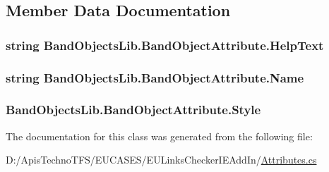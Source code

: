 \subsection{Member Data Documentation}
\hypertarget{class_band_objects_lib_1_1_band_object_attribute_a4ea2e87e2eae8922abd8b509c0f7596c}{
\subsubsection[{Help\+Text}]{\setlength{\rightskip}{0pt plus 5cm}string Band\+Objects\+Lib.\+Band\+Object\+Attribute.\+Help\+Text}}\label{class_band_objects_lib_1_1_band_object_attribute_a4ea2e87e2eae8922abd8b509c0f7596c}
\hypertarget{class_band_objects_lib_1_1_band_object_attribute_a4f24365158ed7f6c429e54410b38edbf}{
\subsubsection[{Name}]{\setlength{\rightskip}{0pt plus 5cm}string Band\+Objects\+Lib.\+Band\+Object\+Attribute.\+Name}}\label{class_band_objects_lib_1_1_band_object_attribute_a4f24365158ed7f6c429e54410b38edbf}
\hypertarget{class_band_objects_lib_1_1_band_object_attribute_ab086fd13146611067913baf79ad1b8be}{
\subsubsection[{Style}]{ Band\+Objects\+Lib.\+Band\+Object\+Attribute.\+Style}}\label{class_band_objects_lib_1_1_band_object_attribute_ab086fd13146611067913baf79ad1b8be}


The documentation for this class was generated from the following file\+:\begin{DoxyCompactItemize}
\item 
D\+:/\+Apis\+Techno\+T\+F\+S/\+E\+U\+C\+A\+S\+E\+S/\+E\+U\+Links\+Checker\+I\+E\+Add\+In/\hyperlink{_attributes_8cs}{Attributes.\+cs}\end{DoxyCompactItemize}
